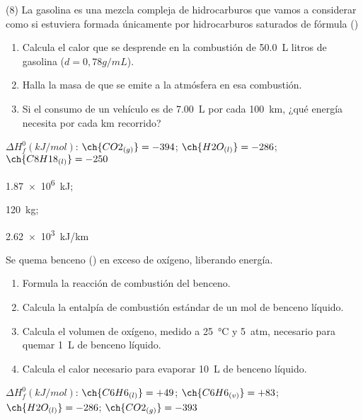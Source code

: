 \documentclass[10pt]{article}
\newenvironment{gexdatos}{
    \noindent\makebox[0pt][r]{\textit{Datos:}}
}{\vspace{5pt}}
\begin{document}
\begin{multicols}{2}
\begin{exercise}
  (8) La gasolina es una mezcla compleja de hidrocarburos que
  vamos a considerar como si estuviera formada únicamente
  por hidrocarburos saturados de fórmula ()
  \begin{enumerate}
    \item Calcula el calor que se desprende en la combustión de
    \SI{50.0}{\liter} litros de gasolina (\( d = 0,78 g/mL \)).
    \item Halla la masa de  que se emite a la atmósfera en esa
    combustión.
    \item Si el consumo de un vehículo es de \SI{7.00}{\liter} por cada
    \SI{100}{km}, ¿qué energía necesita por cada \si{km} recorrido?
  \end{enumerate}

  \begin{gexdatos}
    \( \Delta H^0_f (\si{kJ/mol}) \): \( \ch{CO2_{(g)}} = -394 \); \( \ch{H2O_{(l)}} = -286 \); \( \ch{C8H18_{(l)}} = -250 \)
  \end{gexdatos}

\end{exercise}

\begin{solution}
  \begin{enumerate*}
    \item \SI{1.87e6}{kJ}; \item \SI{120}{\kilo\gram}; \item \SI{2.62e3}{kJ/km}
  \end{enumerate*}
\end{solution}


\begin{exercise}
  Se quema benceno () en exceso de oxígeno, liberando energía.

  \begin{enumerate}
    \item Formula la reacción de combustión del benceno.
    \item Calcula la entalpía de combustión estándar de un mol de
    benceno líquido.
    \item Calcula el volumen de oxígeno, medido a \SI{25}{\celsius} y \SI{5}{atm}, necesario para quemar \SI{1}{\liter} de benceno líquido.
    \item Calcula el calor necesario para evaporar \SI{10}{\liter} de benceno líquido.
  \end{enumerate}

  \begin{gexdatos}
    \( \Delta H^0_f (\si{kJ/mol}) \):
    \( \ch{C6H6_{(l)}}  = +49 \);
    \( \ch{C6H6_{(v)}}  = +83 \);
    \( \ch{H2O_{(l)}}   = -286 \);
    \( \ch{CO2_{(g)}}   = -393 \)
  \end{gexdatos}


\end{exercise}
\end{multicols}
\end{document}
